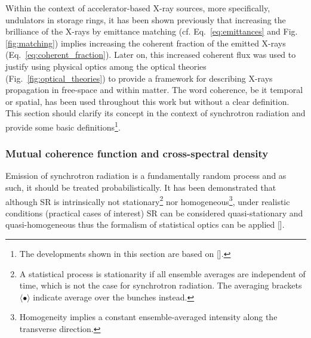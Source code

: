 \begin{refsection}
Within the context of accelerator-based X-ray sources, more specifically, undulators in storage rings, it has been shown previously that increasing the brilliance of the X-rays by emittance matching (cf. Eq.~\ref{eq:emittances} and Fig.\ref{fig:matching}) implies increasing the coherent fraction of the emitted X-rays (Eq.~\ref{eq:coherent_fraction}). Later on, this increased coherent flux was used to justify using physical optics among the optical theories (Fig.~\ref{fig:optical_theories}) to provide a framework for describing X-rays propagation in free-space and within matter. The word coherence, be it temporal or spatial, has been used throughout this work but without a clear definition. This section should clarify its concept in the context of synchrotron radiation and provide some basic definitions\footnote{The developments shown in this section are based on [\cite[\textit{§4}]{Mandel1995}].}.

\subsubsection*{Mutual coherence function and cross-spectral density}

Emission of synchrotron radiation is a fundamentally random process and as such, it should be treated probabilistically. It has been demonstrated that although SR is intrinsically not stationary\footnote{A statistical process is stationarity if all ensemble averages are independent of time, which is not the case for synchrotron radiation. The averaging brackets $\langle \bullet \rangle$ indicate average over the bunches instead.} nor homogeneous\footnote{Homogeneity implies a constant ensemble-averaged intensity along the transverse direction.}, under realistic conditions (practical cases of interest) SR can be considered quasi-stationary and quasi-homogeneous thus the formalism of statistical optics can be applied [\cite{Geloni2008}].


\end{refsection}
